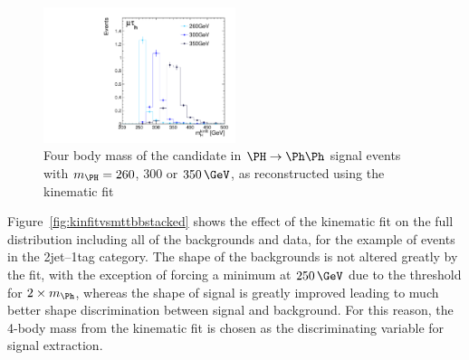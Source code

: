 \begin{figure}
\begin{center}
    \includegraphics[width=0.5\textwidth]
      {plots/Hhh/m_H_kinfit_signalmasses_2jet2tagSFMassCuts_mt.pdf}

\end{center}
\caption[]{
Four body mass of the candidate \PH in $\PH\to\Ph\Ph$ signal events with
$m_{\PH}=260$, $300$ or $350\,\GeV$, as reconstructed using the kinematic fit}
\label{fig:kinfitsignalmasses}
\end{figure} 

Figure~\ref{fig:kinfitvsmttbbstacked} shows the effect of the kinematic
fit on the full distribution including all of the backgrounds and data, for the
example of events in the 2jet--1tag category. The shape of the backgrounds is
not altered greatly by the fit, with the exception of forcing a minimum at
$250\,\GeV$ due to the threshold for $2\times m_{\Ph}$, whereas the shape of
signal is greatly improved leading to much better shape discrimination between
signal and background. For this reason, the 4-body mass from the kinematic fit
is chosen as the discriminating variable for signal extraction.

